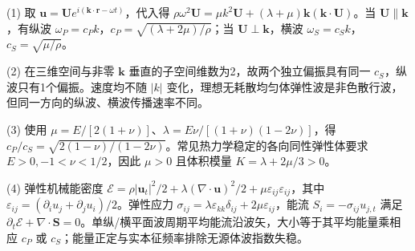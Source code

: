 (1) 取 \(\mathbf u=\mathbf U e^{i(\mathbf k\cdot\mathbf r-\omega t)}\)，代入得 \(\rho\omega^2\mathbf U=\mu k^2\mathbf U+(\lambda+\mu)\mathbf k(\mathbf k\cdot\mathbf U)\)。当 \(\mathbf U\parallel\mathbf k\)，有纵波 \(\omega_P=c_Pk\)，\(c_P=\sqrt{(\lambda+2\mu)/\rho}\)；当 \(\mathbf U\perp\mathbf k\)，横波 \(\omega_S=c_Sk\)，\(c_S=\sqrt{\mu/\rho}\)。

(2) 在三维空间与非零 \(\mathbf k\) 垂直的子空间维数为2，故两个独立偏振具有同一 \(c_S\)，纵波只有1个偏振。速度均不随 \(|k|\) 变化，理想无耗散均匀体弹性波是非色散行波，但同一方向的纵波、横波传播速率不同。

(3) 使用 \(\mu=E/[2(1+\nu)]\)、\(\lambda=E\nu/[(1+\nu)(1-2\nu)]\)，得 \(\boxed{c_P/c_S=\sqrt{2(1-\nu)/(1-2\nu)}}\)。常见热力学稳定的各向同性弹性体要求 \(E>0,-1<\nu<1/2\)，因此 \(\mu>0\) 且体积模量 \(K=\lambda+2\mu/3>0\)。

(4) 弹性机械能密度 \(\mathcal E=\rho|\mathbf u_t|^2/2+\lambda(\nabla\cdot\mathbf u)^2/2+\mu\varepsilon_{ij}\varepsilon_{ij}\)，其中 \(\varepsilon_{ij}=(\partial_i u_j+\partial_j u_i)/2\)。弹性应力 \(\sigma_{ij}=\lambda\varepsilon_{kk}\delta_{ij}+2\mu\varepsilon_{ij}\)，能流 \(S_i=-\sigma_{ij}u_{j,t}\) 满足 \(\partial_t\mathcal E+\nabla\cdot\mathbf S=0\)。单纵/横平面波周期平均能流沿波矢，大小等于其平均能量乘相应 \(c_P\) 或 \(c_S\)；能量正定与实本征频率排除无源体波指数失稳。
